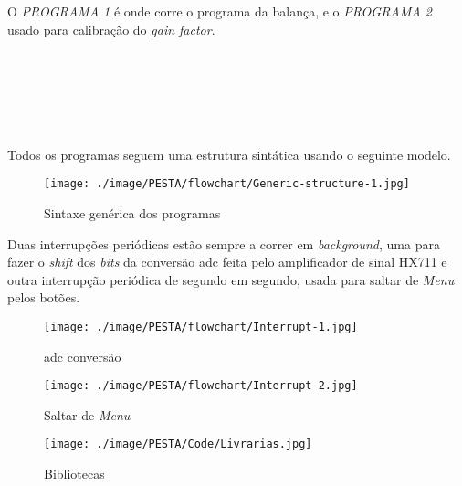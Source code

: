 O \textit{PROGRAMA 1} é onde corre o programa da balança, e o \textit{PROGRAMA 2} usado para calibração do \textit{gain factor}.
\\
\\
\\
\\
\\
\\
\\
Todos os programas seguem uma estrutura sintática usando o seguinte modelo.
\\
\begin{figure}[H]
	\centering
	\texttt{[image: ./image/PESTA/flowchart/Generic-structure-1.jpg]}
	\caption{Sintaxe genérica dos programas}
	\label{Geneic_structure}
\end{figure}
Duas interrupções periódicas estão sempre a correr em \textit{background}, uma para fazer o \textit{shift} dos \textit{bits} da conversão \acs{adc} feita pelo amplificador de sinal HX711 e outra interrupção periódica de segundo em segundo, usada para saltar de \textit{Menu} pelos botões.
\\
\begin{minipage}{\linewidth}
	\begin{minipage}{.5\linewidth}
		\begin{figure}[H]
			\centering
			\texttt{[image: ./image/PESTA/flowchart/Interrupt-1.jpg]}
			\caption{\acs{adc} conversão}
			\label{Interrupt_1}
		\end{figure}
	\end{minipage}
	\begin{minipage}{.5\linewidth}
		\begin{figure}[H]
			\centering
			\texttt{[image: ./image/PESTA/flowchart/Interrupt-2.jpg]}
			\caption{Saltar de \textit{Menu}}
			\label{Interrupt_2}
		\end{figure}
	\end{minipage}
\end{minipage}
\begin{minipage}{.40\linewidth}
	\begin{figure}[H]
		\flushleft
		\captionsetup{justification=raggedright,singlelinecheck=false}
		\texttt{[image: ./image/PESTA/Code/Livrarias.jpg]}
		\caption{Bibliotecas}
		\label{Bibliotecas}
	\end{figure}
\end{minipage}
